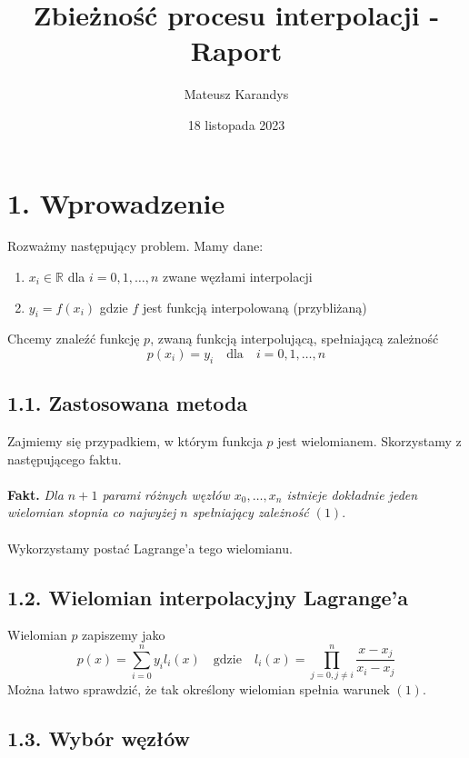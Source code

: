\documentclass{article}
\title{Zbieżność procesu interpolacji - Raport}
\author{Mateusz Karandys}
\date{18 listopada 2023}
\begin{document}
	
	\maketitle
	
	\section*{1. Wprowadzenie}
	
	Rozważmy następujący problem. Mamy dane:
	\begin{enumerate}
		\item $x_i \in \mathbb{R}$ dla $i = 0, 1, \ldots, n$ zwane węzłami interpolacji
		\item $y_i = f(x_i)$ gdzie $f$ jest funkcją interpolowaną (przybliżaną)
	\end{enumerate}
	Chcemy znaleźć funkcję $p$, zwaną funkcją interpolującą, spełniającą zależność
	\begin{equation}
	p(x_i) = y_i \quad \text{dla} \quad i = 0, 1, \dots, n
	\end{equation}
	
	\subsection*{1.1. Zastosowana metoda}
	
	Zajmiemy się przypadkiem, w którym funkcja $p$ jest wielomianem. Skorzystamy z następującego faktu.\\\\
	\textbf{Fakt.}
	\textit{Dla $n+1$ parami różnych węzłów $x_0, \ldots, x_n$ istnieje dokładnie jeden wielomian stopnia co najwyżej $n$ spełniający zależność $(1)$}.\\\\
	Wykorzystamy postać Lagrange'a tego wielomianu.

	\subsection*{1.2. Wielomian interpolacyjny Lagrange'a}
	
	Wielomian $p$ zapiszemy jako 
	\[
		p(x) = \sum_{i=0}^n y_il_i(x) \quad \text{gdzie} \quad l_i(x) = \prod_{j=0, j \ne i}^n \frac{x-x_j}{x_i-x_j}
	\]
	Można łatwo sprawdzić, że tak określony wielomian spełnia warunek $(1)$.
	
	\subsection*{1.3. Wybór węzłów}
	
\end{document}
